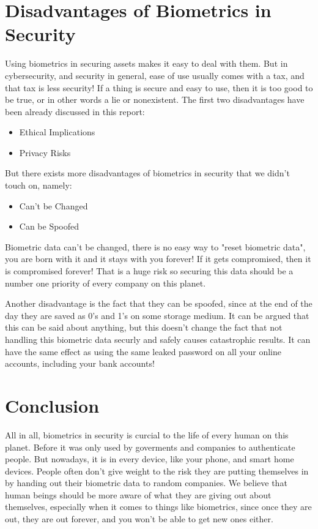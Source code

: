 \documentclass[conference]{IEEEtran}
\begin{document}
\section{Disadvantages of Biometrics in Security}

Using biometrics in securing assets makes it easy to deal with them. But in cybersecurity, and security in general, ease of use usually comes with a tax, and that tax is less security! If a thing is secure and easy to use, then it is too good to be true, or in other words a lie or nonexistent. The first two disadvantages have been already discussed in this report:
\begin{itemize}
    \item Ethical Implications
    \item Privacy Risks
\end{itemize}

But there exists more disadvantages of biometrics in security that we didn't touch on, namely:
\begin{itemize}
    \item Can't be Changed
    \item Can be Spoofed
\end{itemize}

Biometric data can't be changed, there is no easy way to "reset biometric data", you are born with it and it stays with you forever! If it gets compromised, then it is compromised forever! That is a huge risk so securing this data should be a number one priority of every company on this planet.

Another disadvantage is the fact that they can be spoofed, since at the end of the day they are saved as 0's and 1's on some storage medium. It can be argued that this can be said about anything, but this doesn't change the fact that not handling this biometric data securly and safely causes catastrophic results. It can have the same effect as using the same leaked password on all your online accounts, including your bank accounts!

\section{Conclusion}

All in all, biometrics in security is curcial to the life of every human on this planet. Before it was only used by goverments and companies to authenticate people. But nowadays, it is in every device, like your phone, and smart home devices. People often don't give weight to the risk they are putting themselves in by handing out their biometric data to random companies. We believe that human beings should be more aware of what they are giving out about themselves, especially when it comes to things like biometrics, since once they are out, they are out forever, and you won't be able to get new ones either.



\end{document}
